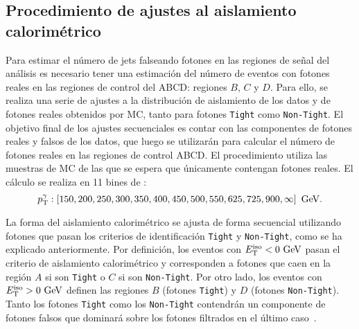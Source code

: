 \subsection{Procedimiento de ajustes al aislamiento calorimétrico}
\label{subsec:bkg:estimation:fits}


Para estimar el número de jets falseando fotones en las regiones de señal del análisis es necesario tener una estimación del número de eventos con fotones reales en las regiones de control del ABCD: regiones \(B\), \(C\) y \(D\). Para ello, se realiza una serie de ajustes a la distribución de aislamiento de los datos y de fotones reales obtenidos por \ac{MC}, tanto para fotones \texttt{Tight} como \texttt{Non-Tight}. El objetivo final de los ajustes secuenciales es contar con las componentes de fotones reales y falsos de los datos, que luego se utilizarán para calcular el número de fotones reales en las regiones de control ABCD. El procedimiento utiliza las muestras de \ac{MC} de las que se espera que únicamente contengan fotones reales. El cálculo se realiza en 11 bines de \ptgam:
\begin{equation*}
    p_{\text{T}}^{\gamma}: \left[ 150, 200, 250, 300, 350, 400, 450, 500, 550, 625, 725, 900, \infty \right]~\text{GeV}.
\end{equation*}


La forma del aislamiento calorimétrico \etiso se ajusta de forma secuencial utilizando fotones que pasan los criterios de identificación \texttt{Tight} y \texttt{Non-Tight}, como se ha explicado anteriormente.
Por definición, los eventos con \(E_{\text{T}}^{\text{iso}}<0~\text{GeV}\) pasan el criterio de aislamiento calorimétrico y corresponden a fotones que caen en la región \(A\) si son \texttt{Tight} o \(C\) si son \texttt{Non-Tight}. Por otro lado, los eventos con \(E_{\text{T}}^{\text{iso}}>0~\text{GeV}\) definen las regiones \(B\) (fotones \texttt{Tight}) y \(D\) (fotones \texttt{Non-Tight}).
Tanto los fotones \texttt{Tight} como los \texttt{Non-Tight} contendrán un componente de fotones falsos que dominará sobre los fotones filtrados en el último caso~\cite{ATLAS-DiPhotonSearchIsolation-NOTE,ATLAS-EleMuPhoIsolation-NOTE}.

